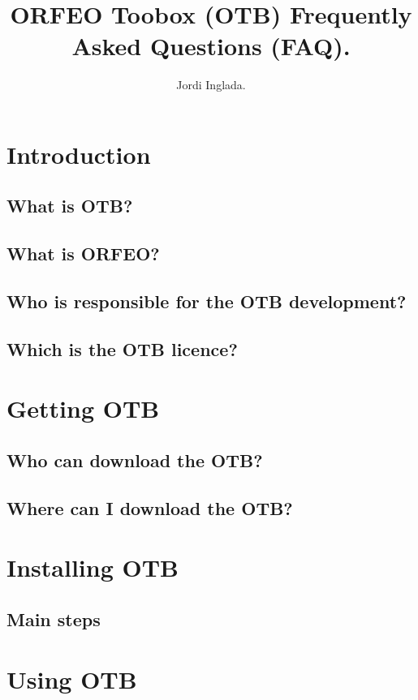 \documentclass[english]{article}
\begin{document}
\title{ORFEO Toobox (OTB) Frequently Asked Questions (FAQ).}


\author{Jordi Inglada. }


\maketitle

\tableofcontents

\section{Introduction}
\subsection{What is OTB?}
\subsection{What is ORFEO?}
\subsection{Who is responsible for the OTB development?}
\subsection{Which is the OTB licence?}

\section{Getting OTB}
\subsection{Who can download the OTB?}
\subsection{Where can I download the OTB?}

\section{Installing OTB}
\subsection{Main steps}

\section{Using OTB}
\end{document}
